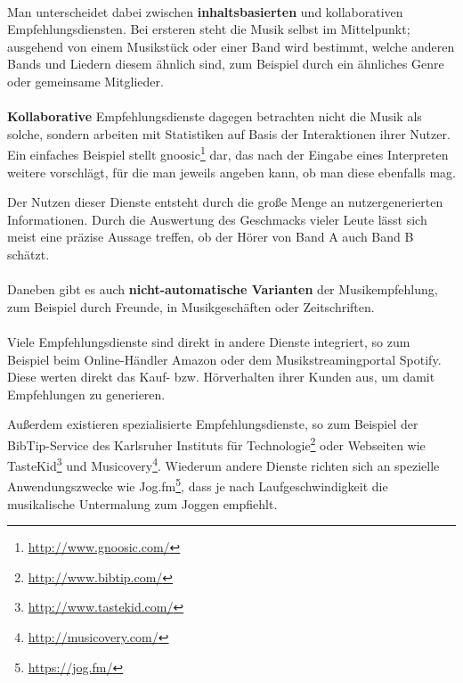 \paragraph{} Man unterscheidet dabei zwischen \textbf{inhaltsbasierten} und kollaborativen Empfehlungsdiensten. Bei ersteren steht die Musik selbst im Mittelpunkt; ausgehend von einem Musikstück oder einer Band wird bestimmt, welche anderen Bands und Liedern diesem ähnlich sind, zum Beispiel durch ein ähnliches Genre oder gemeinsame Mitglieder.

\paragraph{} \textbf{Kollaborative} Empfehlungsdienste dagegen betrachten nicht die Musik als solche, sondern arbeiten mit Statistiken auf Basis der Interaktionen ihrer Nutzer. Ein einfaches Beispiel stellt gnoosic\footnote{\url{http://www.gnoosic.com/}} dar, das nach der Eingabe eines Interpreten weitere vorschlägt, für die man jeweils angeben kann, ob man diese ebenfalls mag. 

Der Nutzen dieser Dienste entsteht durch die große Menge an nutzergenerierten Informationen. Durch die Auswertung des Geschmacks vieler Leute lässt sich meist eine präzise Aussage treffen, ob der Hörer von Band A auch Band B schätzt.

\paragraph{} Daneben gibt es auch \textbf{nicht-automatische Varianten} der Musikempfehlung, zum Beispiel durch Freunde, in Musikgeschäften oder Zeitschriften.

\paragraph{} Viele Empfehlungsdienste sind direkt in andere Dienste integriert, so zum Beispiel beim Online-Händler Amazon oder dem Musikstreamingportal Spotify. Diese werten direkt das Kauf- bzw. Hörverhalten ihrer Kunden aus, um damit Empfehlungen zu generieren.  

Außerdem existieren spezialisierte Empfehlungsdienste, so zum Beispiel der BibTip-Service des Karlsruher Instituts für Technologie\footnote{\url{http://www.bibtip.com/}} oder Webseiten wie TasteKid\footnote{\url{http://www.tastekid.com/}} und Musicovery\footnote{\url{http://musicovery.com/}}. Wiederum andere Dienste richten sich an spezielle Anwendungszwecke wie Jog.fm\footnote{\url{https://jog.fm/}}, dass je nach Laufgeschwindigkeit die musikalische Untermalung zum Joggen empfiehlt.

